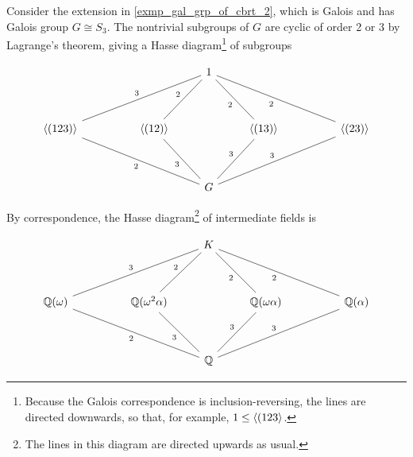 \begin{example}
    Consider the extension in \cref{exmp_gal_grp_of_cbrt_2}, which is Galois and has Galois group $G \cong S_3$. The nontrivial subgroups of $G$ are cyclic of order 2 or 3 by Lagrange's theorem, giving a Hasse diagram\footnote{Because the Galois correspondence is inclusion-reversing, the lines are directed downwards, so that, for example, $1 \leq \langle {(123} \rangle$.} of subgroups
    \begin{figure}[h]
    \captionsetup{justification=centering}
        \[
            \begin{tikzcd}
            	&&& 1 \\
            	\\
            	{\langle (123) \rangle} && {\langle (12) \rangle} && {\langle (13) \rangle} && {\langle (23) \rangle} \\
            	\\
            	&&& G
            	\arrow["3", no head, from=3-1, to=1-4]
            	\arrow["2", no head, from=3-3, to=1-4]
            	\arrow["2", no head, from=3-5, to=1-4]
            	\arrow["2", no head, from=3-7, to=1-4]
            	\arrow["2", no head, from=5-4, to=3-1]
            	\arrow["3", no head, from=5-4, to=3-3]
            	\arrow["3", no head, from=5-4, to=3-5]
            	\arrow["3", no head, from=5-4, to=3-7]
            \end{tikzcd}
        \]
    \end{figure}
    
    \newpage

    By correspondence, the Hasse diagram\footnote{The lines in this diagram are directed upwards as usual.} of intermediate fields is
    \begin{figure}[h]
        \[
            \begin{tikzcd}
            	&&& K \\
            	\\
            	{\bb{Q}(\omega)} && {\bb{Q}(\omega^2 \alpha)} && {\bb{Q}(\omega \alpha)} && {\bb{Q}(\alpha)} \\
            	\\
            	&&& \bb{Q}
            	\arrow["3", no head, from=3-1, to=1-4]
            	\arrow["2", no head, from=3-3, to=1-4]
            	\arrow["2", no head, from=3-5, to=1-4]
            	\arrow["2", no head, from=3-7, to=1-4]
            	\arrow["2", no head, from=5-4, to=3-1]
            	\arrow["3", no head, from=5-4, to=3-3]
            	\arrow["3", no head, from=5-4, to=3-5]
            	\arrow["3", no head, from=5-4, to=3-7]
            \end{tikzcd}
        \]
    \end{figure}
    

\end{example}
